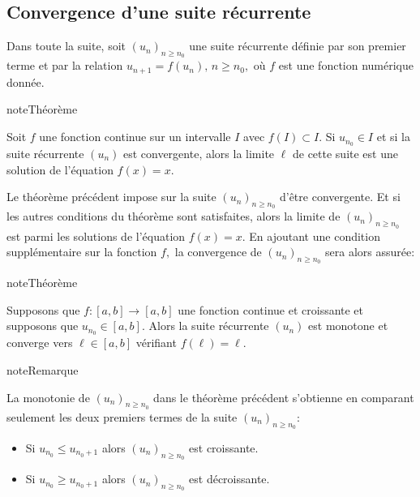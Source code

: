 \documentclass[letterpaper,10pt,french]{jupyterBook}
\begin{document}
\subsection{Convergence d’une suite récurrente}
\label{\detokenize{suites:convergence-d-une-suite-recurrente}}
\sphinxAtStartPar
Dans toute la suite, soit \((u_n)_{n\geq n_0}\) une suite récurrente définie par son premier terme et par la relation \(u_{n+1}=f(u_n),\,n\geq n_0,\) où \(f\) est une fonction numérique donnée.

\begin{sphinxadmonition}{note}{Théorème}

\sphinxAtStartPar
Soit \(f\) une fonction continue sur un intervalle \(I\) avec \(f(I)\subset I.\) Si \(u_{n_0}\in I\) et si la suite récurrente \((u_n)\) est convergente, alors la limite \(\ell\) de cette suite est une solution de l’équation \(f(x)=x.\)
\end{sphinxadmonition}

\sphinxAtStartPar
Le théorème précédent impose sur la suite \((u_n)_{n\geq n_0}\) d’être convergente. Et si les autres conditions du théorème sont satisfaites, alors la limite de \((u_n)_{n\geq n_0}\) est parmi les solutions de l’équation \(f(x)=x.\) En ajoutant une condition supplémentaire sur la fonction \(f,\) la convergence de \((u_n)_{n\geq n_0}\) sera alors assurée:

\begin{sphinxadmonition}{note}{Théorème}

\sphinxAtStartPar
Supposons que \(f:[a,b]\rightarrow [a,b]\) une fonction continue et croissante et supposons que \(u_{n_0}\in [a,b].\) Alors la suite récurrente \((u_n)\) est monotone et converge vers \(\ell\in [a,b]\) vérifiant \(f(\ell)=\ell.\)
\end{sphinxadmonition}

\begin{sphinxadmonition}{note}{Remarque}

\sphinxAtStartPar
La monotonie de \((u_n)_{n\geq n_0}\) dans le théorème précédent s’obtienne en comparant seulement les deux premiers termes de la suite \((u_n)_{n\geq n_0}:\)
\begin{itemize}
\item {} 
\sphinxAtStartPar
Si \(u_{n_0}\leq u_{n_0+1}\) alors \((u_n)_{n\geq n_0}\) est croissante.

\item {} 
\sphinxAtStartPar
Si \(u_{n_0}\geq u_{n_0+1}\) alors \((u_n)_{n\geq n_0}\) est décroissante.

\end{itemize}
\end{sphinxadmonition}
\end{document}
